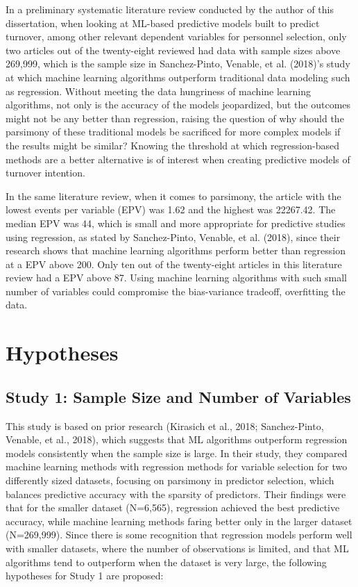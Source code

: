 \documentclass[
  man]{apa7}
\begin{document}
In a preliminary systematic literature review conducted by the author of this dissertation, when looking at ML-based predictive models built to predict turnover, among other relevant dependent variables for personnel selection, only two articles out of the twenty-eight reviewed had data with sample sizes above 269,999, which is the sample size in Sanchez-Pinto, Venable, et al. (2018)'s study at which machine learning algorithms outperform traditional data modeling such as regression.
Without meeting the data hungriness of machine learning algorithms, not only is the accuracy of the models jeopardized, but the outcomes might not be any better than regression, raising the question of why should the parsimony of these traditional models be sacrificed for more complex models if the results might be similar? Knowing the threshold at which regression-based methods are a better alternative is of interest when creating predictive models of turnover intention.

In the same literature review, when it comes to parsimony, the article with the lowest events per variable (EPV) was 1.62 and the highest was 22267.42.
The median EPV was 44, which is small and more appropriate for predictive studies using regression, as stated by Sanchez-Pinto, Venable, et al. (2018), since their research shows that machine learning algorithms perform better than regression at a EPV above 200.
Only ten out of the twenty-eight articles in this literature review had a EPV above 87.
Using machine learning algorithms with such small number of variables could compromise the bias-variance tradeoff, overfitting the data.

\hypertarget{hypotheses}{%
\section{Hypotheses}\label{hypotheses}}

\hypertarget{study-1-sample-size-and-number-of-variables}{%
\subsection{Study 1: Sample Size and Number of Variables}\label{study-1-sample-size-and-number-of-variables}}

This study is based on prior research (Kirasich et al., 2018; Sanchez-Pinto, Venable, et al., 2018), which suggests that ML algorithms outperform regression models consistently when the sample size is large.
In their study, they compared machine learning methods with regression methods for variable selection for two differently sized datasets, focusing on parsimony in predictor selection, which balances predictive accuracy with the sparsity of predictors.
Their findings were that for the smaller dataset (N=6,565), regression achieved the best predictive accuracy, while machine learning methods faring better only in the larger dataset (N=269,999).
Since there is some recognition that regression models perform well with smaller datasets, where the number of observations is limited, and that ML algorithms tend to outperform when the dataset is very large, the following hypotheses for Study 1 are proposed:
\end{document}
